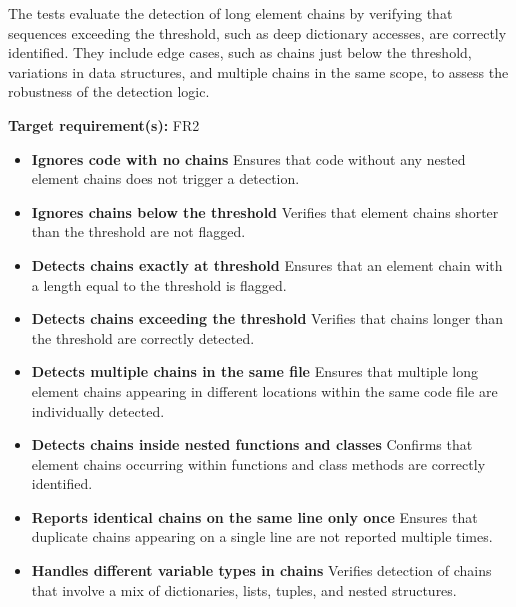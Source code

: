 \documentclass[12pt, titlepage]{article}
\begin{document}
The tests evaluate the detection of long element chains by verifying that sequences exceeding the threshold, such as deep dictionary accesses, are correctly identified. They include edge cases, such as chains just below the threshold, variations in data structures, and multiple chains in the same scope, to assess the robustness of the detection logic.

\textbf{Target requirement(s):} FR2 ~\cite{SRS} \\

\begin{itemize}
\item \textbf{Ignores code with no chains} \newline
Ensures that code without any nested element chains does not trigger a detection.

\item \textbf{Ignores chains below the threshold} \newline
Verifies that element chains shorter than the threshold are not flagged.

\item \textbf{Detects chains exactly at threshold} \newline
Ensures that an element chain with a length equal to the threshold is flagged.

\item \textbf{Detects chains exceeding the threshold} \newline
Verifies that chains longer than the threshold are correctly detected.

\item \textbf{Detects multiple chains in the same file} \newline
Ensures that multiple long element chains appearing in different locations within the same code file are individually detected.

\item \textbf{Detects chains inside nested functions and classes} \newline
Confirms that element chains occurring within functions and class methods are correctly identified.

\item \textbf{Reports identical chains on the same line only once} \newline
Ensures that duplicate chains appearing on a single line are not reported multiple times.

\item \textbf{Handles different variable types in chains} \newline
Verifies detection of chains that involve a mix of dictionaries, lists, tuples, and nested structures.


\end{itemize}
\end{document}
